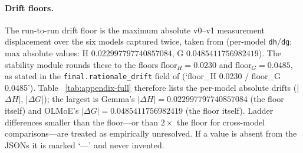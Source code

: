 \documentclass[sigconf]{acmart}
\begin{document}
\paragraph{Drift floors.}
The run-to-run drift floor is the maximum absolute v0--v1 measurement
displacement over the six models captured twice, taken from
 (per-model
\texttt{dh}/\texttt{dg}; max absolute values: H $0.022997797740857084$,
G $0.0485411756982419$). The stability module rounds these to the floors
$\mathrm{floor}_H = 0.0230$ and $\mathrm{floor}_G = 0.0485$, as stated in the
\texttt{final.rationale\_drift} field of
 (`floor\_H 0.0230 / floor\_G 0.0485'). Table
~\ref{tab:appendix-full} therefore lists the per-model absolute drifts
(|$\Delta H$|, |$\Delta G$|); the largest is Gemma's $|\Delta H| =
0.022997797740857084$ (the floor itself) and OLMoE's $|\Delta G| =
0.0485411756982419$ (the floor itself). Ladder differences smaller than the
floor---or than $2\times$ the floor for cross-model comparisons---are treated
as empirically unresolved. If a value is absent from the JSONs it is marked
`---' and never invented.
\end{document}
